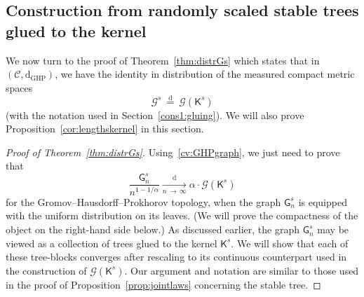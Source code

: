 \documentclass[AHL,Unicode,longabstracts,published]{cedram}
\newcommand{\GHP}{\mathrm{GHP}}
\newcommand{\rmd}{\mathrm{d}}
\newcommand{\cG}{\mathcal{G}}
\newcommand{\sG}{\mathsf{G}}
\newcommand{\sK}{\mathsf{K}}
\newcommand{\scrC}{\mathscr{C}}
\begin{document}
\subsection{Construction from randomly scaled stable trees glued to the kernel}\label{sec:distrGs}

We now turn to the proof of Theorem~\ref{thm:distrGs} which states that in $(\scrC, \rmd_{\GHP})$, we have the identity in distribution of the measured compact metric spaces
\begin{equation}\label{distrGs}
\cG^s \ \overset{\rmd}= \ \cG\left(\sK^s\right)
\end{equation}
(with the notation used in Section~\ref{cons1:gluing}). We will also prove Proposition~\ref{cor:lengthskernel} in this section.

\begin{proof}[Proof of Theorem~\ref{thm:distrGs}]
Using~\eqref{cv:GHPgraph}, we just need to prove that
\[
\frac{\sG_n^s}{n^{1-1/\alpha}} \underset{n \,\rightarrow\,\infty}{\overset{\rmd}\longrightarrow} \alpha \cdot \cG(\sK^s)
\]
for the Gromov--Hausdorff--Prokhorov topology, when the graph $\sG_n^s$ is equipped with the uniform distribution on its leaves. (We will prove the compactness of the object on the right-hand side below.) As discussed earlier, the graph $\sG_n^s$ may be viewed as a collection of trees glued to the kernel $\sK^s$. We will show that each of these tree-blocks converges after rescaling to its continuous counterpart used in the construction of $\cG(\sK^s)$. Our argument and notation are similar to those used in the proof of Proposition~\ref{prop:jointlaws} concerning the stable tree.


\end{proof}
\end{document}
